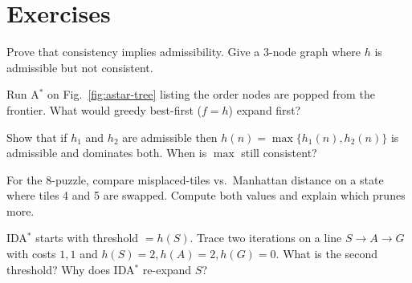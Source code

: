 \section{Exercises}
\begin{exercise}Prove that consistency implies admissibility. Give a 3-node graph where $h$ is admissible but not consistent.\end{exercise}
\begin{exercise}Run A$^{*}$ on Fig.~\ref{fig:astar-tree} listing the order nodes are popped from the frontier. What would greedy best-first ($f=h$) expand first?\end{exercise}
\begin{exercise}Show that if $h_1$ and $h_2$ are admissible then $h(n)=\max\{h_1(n),h_2(n)\}$ is admissible and dominates both. When is $\max$ still consistent?\end{exercise}
\begin{exercise}For the 8-puzzle, compare misplaced-tiles vs.\ Manhattan distance on a state where tiles 4 and 5 are swapped. Compute both values and explain which prunes more.\end{exercise}
\begin{exercise}IDA$^{*}$ starts with threshold $=h(S)$. Trace two iterations on a line $S\to A\to G$ with costs $1,1$ and $h(S)=2,h(A)=2,h(G)=0$. What is the second threshold? Why does IDA$^{*}$ re-expand $S$?\end{exercise}
